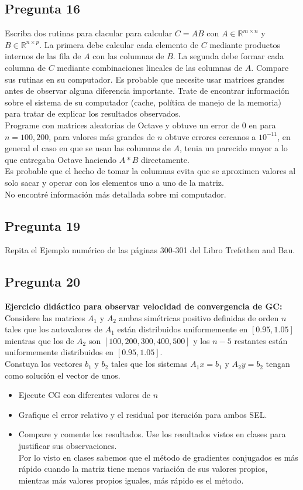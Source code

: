 \documentclass{article}
\def\R{\mbox{\(\mathbb{R}\)}}
\begin{document}
\subsection*{Pregunta 16}
Escriba dos rutinas para clacular para calcular $C=AB$ con $A \in \R^{m\times n}$ y $B\in \R^{n\times p}$. La primera debe calcular cada elemento de $C$ mediante productos internos de las fila de $A$ con las columnas de $B$. La segunda debe formar cada columna de $C$ mediante combinaciones lineales de las columnas de $A$. Compare sus rutinas en su computador. Es probable que necesite usar matrices grandes antes de observar alguna diferencia importante. Trate de encontrar información sobre el sistema de su computador (cache, política de manejo de la memoria) para tratar de explicar los resultados observados.\\

Programe con matrices aleatorias de Octave y obtuve un error de $0$ en para $n=100, 200$, para valores más grandes de $n$ obtuve errores cercanos a $10^{-11}$, en general el caso en que se usan las columnas de $A$, tenia un parecido mayor a lo que entregaba Octave haciendo $A*B$ directamente.\\

Es probable que el hecho de tomar la columnas evita que se aproximen valores al solo sacar y operar con los elementos uno a uno de la matriz.\\

No encontré información más detallada sobre mi computador.
\subsection*{Pregunta 19}
Repita el Ejemplo numérico de las páginas 300-301 del Libro Trefethen and Bau.
\subsection*{Pregunta 20}
{\bf Ejercicio didáctico para observar velocidad de convergencia de GC:} Considere las matrices $A_1$ y $A_2$ ambas simétricas positivo definidas de orden $n$ tales que los autovalores de $A_1$ están distribuidos uniformemente en $[0.95, 1.05]$ mientras que los de $A_2$ son $[100,200, 300, 400, 500]$ y los $n-5$ restantes están uniformemente distribuidos en $[0.95, 1.05]$.\\
Constuya los vectores $b_1$ y $b_2$ tales que los sistemas $A_1x=b_1$ y $A_2y=b_2$ tengan como solución el vector de unos.\\
\begin{itemize}
\item Ejecute CG con diferentes valores de $n$
\item Grafique el error relativo y el residual por iteración para ambos SEL.
\item Compare y comente los resultados. Use los resultados vistos en clases para justificar sus observaciones.\\

Por lo visto en clases sabemos que el método de gradientes conjugados es más rápido cuando la matriz tiene menos variación de sus valores propios, mientras más valores propios iguales, más rápido es el método.
\end{itemize}
\end{document}
